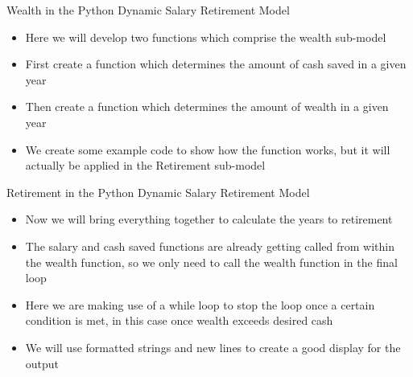 \documentclass[]{article}
\begin{document}
\begin{section}{Wealth in the Python Dynamic Salary Retirement Model}
\begin{itemize}
\item Here we will develop two functions which comprise the wealth sub-model
\item First create a function which determines the amount of cash saved in a given year
\item Then create a function which determines the amount of wealth in a given year
\item We create some example code to show how the function works, but it will actually be applied in the Retirement sub-model
\end{itemize}
\end{section}
\begin{section}{Retirement in the Python Dynamic Salary Retirement Model}
\begin{itemize}
\item Now we will bring everything together to calculate the years to retirement
\item The salary and cash saved functions are already getting called from within the wealth function, so we only need to call the wealth function in the final loop
\item Here we are making use of a while loop to stop the loop once a certain condition is met, in this case once wealth exceeds desired cash
\item We will use formatted strings and new lines to create a good display for the output
\end{itemize}
\end{section}
\end{document}
